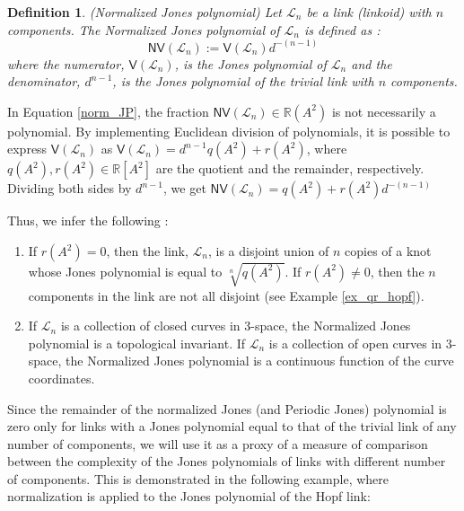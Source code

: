 \documentclass{article}
\newtheorem{definition}{Definition}[section]
\begin{document}
\begin{definition}(Normalized Jones polynomial)
Let  $\mathcal{L}_n$ be a link (linkoid) with $n$ components. The Normalized Jones polynomial of $\mathcal{L}_n$ is defined as :
\begin{equation}
    \mathsf{NV}(\mathcal{L}_n) := \mathsf{V}(\mathcal{L}_n) d^{-(n-1)}%
    \label{norm_JP}
\end{equation}
where the numerator, $\mathsf{V}(\mathcal{L}_n)$, is the Jones polynomial of $\mathcal{L}_n$ and the denominator, $d^{n-1}$, is the Jones polynomial of the trivial link with $n$ components.
\label{normalized_JP}
\end{definition}

In Equation \ref{norm_JP}, the fraction $\mathsf{NV}(\mathcal{L}_n) \in \mathbb{R}(A^2)$ is not necessarily a polynomial. By implementing Euclidean division of polynomials, it is possible to express $\mathsf{V}(\mathcal{L}_n)$ as $\mathsf{V}(\mathcal{L}_n) = d^{n-1} q(A^2) + r(A^2)$,
where $\displaystyle q(A^2), r(A^2) \in \mathbb{R}[A^2]$ are the quotient and the remainder, respectively. Dividing both sides by $d^{n-1}$, we get $\mathsf{NV}(\mathcal{L}_n) =  q(A^2) + r(A^2)d^{-(n-1)}$

Thus, we infer the following :
\begin{enumerate}
   \item If $r(A^2) = 0$, then the link, $\mathcal{L}_n$, is a disjoint union of $n$ copies of a knot whose Jones polynomial is equal to $\displaystyle \sqrt[n]{q(A^2)}$. If $r(A^2) \neq 0$, then the $n$ components in the link are not all disjoint (see Example \ref{ex_qr_hopf}).
   \item If $\mathcal{L}_n$ is a collection of closed curves in 3-space, the Normalized Jones polynomial is a topological invariant. If $\mathcal{L}_n$ is a collection of open curves in 3-space, the Normalized Jones polynomial is a continuous function of the curve coordinates.
\end{enumerate}


Since the remainder of the normalized Jones (and Periodic Jones) polynomial is zero only for links with a Jones polynomial equal to that of the trivial link of any number of components, we will use it as a proxy of a measure of comparison between the complexity of the Jones polynomials of links with different number of components. This is demonstrated in the following example, where normalization is applied to the Jones polynomial of the Hopf link:
\end{document}
